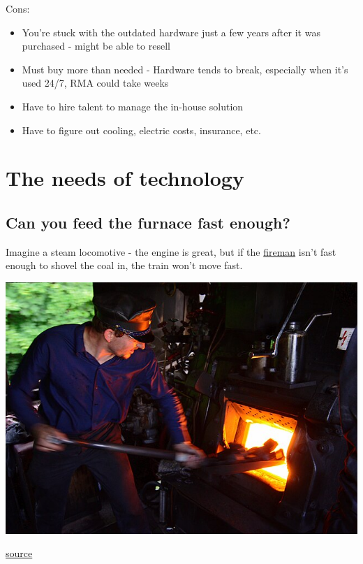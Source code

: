 \documentclass[
]{report}
\providecommand{\tightlist}{%
  \setlength{\itemsep}{0pt}\setlength{\parskip}{0pt}}\usepackage{longtable,booktabs,array}
\begin{document}
Cons:

\begin{itemize}
\tightlist
\item
  You're stuck with the outdated hardware just a few years after it was
  purchased - might be able to resell
\item
  Must buy more than needed - Hardware tends to break, especially when
  it's used 24/7, RMA could take weeks
\item
  Have to hire talent to manage the in-house solution
\item
  Have to figure out cooling, electric costs, insurance, etc.
\end{itemize}

\section{The needs of technology}\label{the-needs-of-technology}

\subsection{Can you feed the furnace fast
enough?}\label{can-you-feed-the-furnace-fast-enough}

Imagine a steam locomotive - the engine is great, but if the
\href{https://en.wikipedia.org/wiki/Fireman_(steam_engine)}{fireman}
isn't fast enough to shovel the coal in, the train won't move fast.

\includegraphics{images/640px-Baureihe52Heizer.jpg}

\href{https://commons.wikimedia.org/wiki/File:Baureihe52Heizer.jpg}{source}
\end{document}
